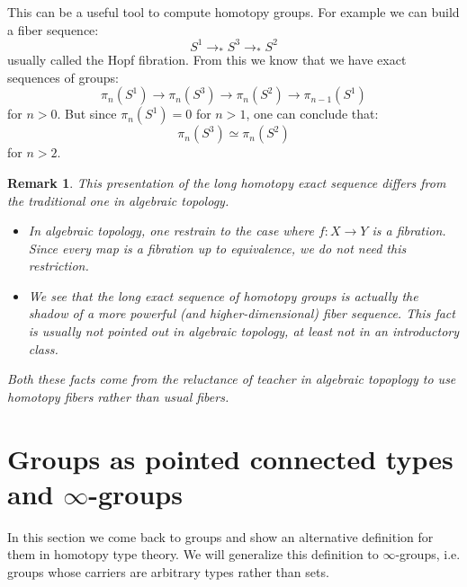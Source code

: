 \documentclass{article}
\newcommand{\se}[1]{\medbreak \medbreak \section{#1}}
\renewcommand{\r}{\rightarrow}
\newtheorem{definition}{Definition}
\newtheorem{remark}{Remark}
\begin{document}
This can be a useful tool to compute homotopy groups. For example we can build a fiber sequence: 
\[S^1\r_* S^3\r_*S^2\]
usually called the Hopf fibration. From this we know that we have exact sequences of groups:
\[\pi_n(S^1)\r \pi_n(S^3)\r \pi_n(S^2)\r \pi_{n-1}(S^1) \]
for $n> 0$. But since $\pi_n(S^1) = 0$ for $n>1$, one can conclude that:
\[\pi_n(S^3)\simeq \pi_n(S^2)\]
for $n>2$.

\begin{remark}
This presentation of the long homotopy exact sequence differs from the traditional one in algebraic topology.
\begin{itemize}
\item In algebraic topology, one restrain to the case where $f:X\r Y$ is a fibration. Since every map is a fibration up to equivalence, we do not need this restriction.
\item We see that the long exact sequence of homotopy groups is actually the shadow of a more powerful (and higher-dimensional) fiber sequence. This fact is usually not pointed out in algebraic topology, at least not in an introductory class.
\end{itemize}
Both these facts come from the reluctance of teacher in algebraic topoplogy to use homotopy fibers rather than usual fibers. %
\end{remark}









\se{Groups as pointed connected types and $\infty$-groups}

In this section we come back to groups and show an alternative definition for them in homotopy type theory. We will generalize this definition to $\infty$-groups, i.e. groups whose carriers are arbitrary types rather than sets.
\end{document}
